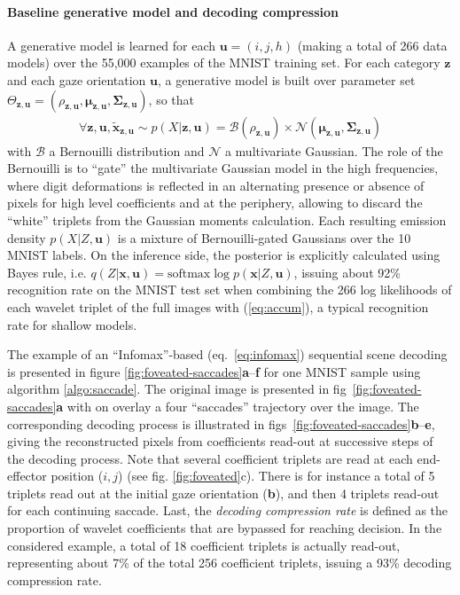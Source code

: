 \documentclass[12pt,twoside,openright]{article}
\begin{document}
\paragraph{Baseline generative model and decoding compression}
A generative model is learned for each $\boldsymbol{u} = (i,j,h)$ (making a total of 266 data models) over the 55,000 examples of the MNIST training set. For each category $\boldsymbol{z}$ and each gaze orientation $\boldsymbol{u}$, a generative model is built over parameter set $\Theta_{\boldsymbol{z},\boldsymbol{u}} = (\rho_{\boldsymbol{z},\boldsymbol{u}}, \boldsymbol{\mu}_{\boldsymbol{z},\boldsymbol{u}}, \boldsymbol{\Sigma}_{\boldsymbol{z},\boldsymbol{u}})$, so that 
\begin{align}
\forall \boldsymbol{z},\boldsymbol{u}, \tilde{\boldsymbol{x}}_{\boldsymbol{z},\boldsymbol{u}} \sim
p(X|\boldsymbol{z},\boldsymbol{u}) =  \mathcal{B}(\rho_{\boldsymbol{z},\boldsymbol{u}}) \times \mathcal{N}(\boldsymbol{\mu}_{\boldsymbol{z},\boldsymbol{u}}, \boldsymbol{\Sigma}_{\boldsymbol{z},\boldsymbol{u}})\label{eq:bernouilli-gated}
\end{align} 
with $\mathcal{B}$ a Bernouilli distribution and $\mathcal{N}$ a multivariate Gaussian. The role of the Bernouilli is to ``gate'' the multivariate Gaussian model in the high frequencies, where digit deformations is reflected in an alternating presence or absence of pixels for high level coefficients and at the periphery, allowing to discard the ``white'' triplets from the Gaussian moments calculation. Each resulting emission density $p(X|Z,\boldsymbol{u})$ is a mixture of Bernouilli-gated Gaussians over the 10 MNIST labels. On the {\color{Purple}inference} side, the posterior is explicitly calculated using Bayes rule, i.e. $q(Z|\boldsymbol{x},\boldsymbol{u}) = \text{softmax} \log p(\boldsymbol{x}|Z,\boldsymbol{u})$, issuing about 92\% recognition rate on the MNIST test set when combining the 266 log likelihoods of each wavelet triplet of the full images with (\ref{eq:accum}), a typical recognition rate for shallow models.

The example of an ``Infomax''-based (eq.~\ref{eq:infomax}) sequential scene decoding is presented in figure \ref{fig:foveated-saccades}\textbf{a}--\textbf{f} for one MNIST sample using algorithm \ref{algo:saccade}.
The original image is presented in fig~\ref{fig:foveated-saccades}\textbf{a} with on overlay a four ``saccades'' trajectory over the image. The corresponding decoding process is illustrated in figs~\ref{fig:foveated-saccades}\textbf{b}--\textbf{e}, giving the reconstructed pixels from  coefficients read-out at successive steps of the decoding process.
Note that several coefficient triplets are read at each end-effector position ($i,j$) (see fig. \ref{fig:foveated}c). There is for instance a total of 5 triplets read out at the initial gaze orientation (\textbf{b}), and then 4 triplets read-out for each continuing saccade. 
Last, the \emph{decoding compression rate} is defined as the proportion of wavelet coefficients that are bypassed for reaching decision. In the considered example, a total of 18 coefficient triplets is  actually read-out, representing about 7\% of the total 256 coefficient triplets, issuing a 93\% decoding compression rate. 
\end{document}
